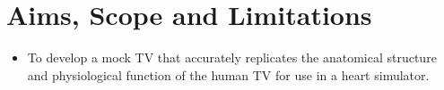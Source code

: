 


\section{Aims, Scope and Limitations}

\begin{itemize}
    \item To develop a mock \gls{TV} that accurately replicates the anatomical structure and physiological function of the human \gls{TV} for use in a heart simulator.
\end{itemize}



